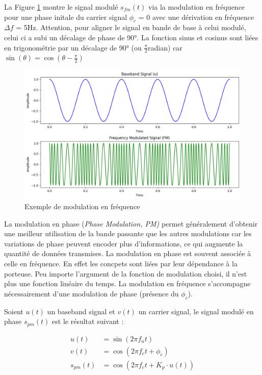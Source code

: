 La Figure \ref{term2} montre le signal modulé $s_{fm}(t)$ via la modulation en fréquence pour une phase initale du carrier signal $\phi_{c}$ = 0 avec une dérivation en fréquence $\Delta f$ = 5Hz. Attention, pour aligner le signal en bande de base à celui modulé, celui ci a subi un décalage de phase de 90°. La fonction sinus et cosinus sont liées en trigonométrie par un décalage de 90° (ou $\frac{\pi}{2} $radian) car $\sin(\theta) = \cos(\theta-\frac{\pi}{2})$

\newpage

\begin{figure}[h]
\centering

\includegraphics[scale=0.5]{images/FM_mod.PNG}
\caption{Exemple de modulation en fréquence}\label{term2}
\end{figure}

La modulation en phase (\textit{Phase Modulation, PM)} permet généralement d'obtenir une meilleur utilisation de la bande passante que les autres modulations car les variations de phase peuvent encoder plus d'informations, ce qui augmente la quantité de données transmises. La modulation en phase est souvent associée à celle en fréquence. En effet les concpets sont liées par leur dépendance à la porteuse. Peu importe l'argument de la fonction de modulation choisi, il n'est plus une fonction linéaire du temps. La modulation en fréquence s'accompagne nécessairement d'une modulation de phase (présence du $\phi_{c}$).

Soient $u(t)$ un baseband signal et $v(t)$ un carrier signal, le signal modulé en phase $s_{pm}(t)$ est le résultat suivant :

\begin{align}
    u(t) &= \sin(2\pi f_{u}t) \\
    v(t) &= \cos(2\pi f_{c}t + \phi_{c}) \\
    s_{pm}(t) &= \cos\left(2\pi f_{c}t + K_{p} \cdot u(t)\right)
\end{align}

